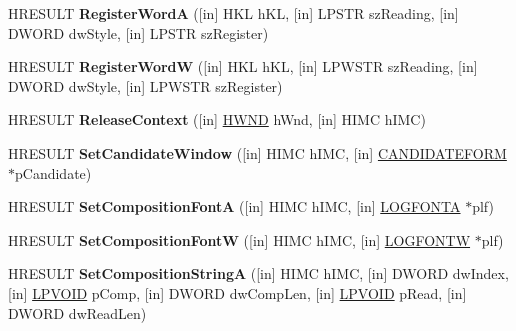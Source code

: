 \begin{DoxyCompactItemize}
H\+R\+E\+S\+U\+LT {\bfseries Register\+WordA} (\mbox{[}in\mbox{]} H\+KL h\+KL, \mbox{[}in\mbox{]} L\+P\+S\+TR sz\+Reading, \mbox{[}in\mbox{]} D\+W\+O\+RD dw\+Style, \mbox{[}in\mbox{]} L\+P\+S\+TR sz\+Register)
\item 
\mbox{\label{interface_i_active_i_m_m_app_aab11a3c8b54a3715093e39444f2d480f}} 
H\+R\+E\+S\+U\+LT {\bfseries Register\+WordW} (\mbox{[}in\mbox{]} H\+KL h\+KL, \mbox{[}in\mbox{]} L\+P\+W\+S\+TR sz\+Reading, \mbox{[}in\mbox{]} D\+W\+O\+RD dw\+Style, \mbox{[}in\mbox{]} L\+P\+W\+S\+TR sz\+Register)
\item 
\mbox{\label{interface_i_active_i_m_m_app_a665730ca4ee2df0d3d7c173e33d30257}} 
H\+R\+E\+S\+U\+LT {\bfseries Release\+Context} (\mbox{[}in\mbox{]} \hyperlink{interfacevoid}{H\+W\+ND} h\+Wnd, \mbox{[}in\mbox{]} H\+I\+MC h\+I\+MC)
\item 
\mbox{\label{interface_i_active_i_m_m_app_a0d21abe7233bb5cc3e3f5140acab9073}} 
H\+R\+E\+S\+U\+LT {\bfseries Set\+Candidate\+Window} (\mbox{[}in\mbox{]} H\+I\+MC h\+I\+MC, \mbox{[}in\mbox{]} \hyperlink{struct_c_a_n_d_i_d_a_t_e_f_o_r_m}{C\+A\+N\+D\+I\+D\+A\+T\+E\+F\+O\+RM} $\ast$p\+Candidate)
\item 
\mbox{\label{interface_i_active_i_m_m_app_ae6ed54a65279d1ae115f1392d75ecdda}} 
H\+R\+E\+S\+U\+LT {\bfseries Set\+Composition\+FontA} (\mbox{[}in\mbox{]} H\+I\+MC h\+I\+MC, \mbox{[}in\mbox{]} \hyperlink{struct_l_o_g_f_o_n_t_a}{L\+O\+G\+F\+O\+N\+TA} $\ast$plf)
\item 
\mbox{\label{interface_i_active_i_m_m_app_a854ea1245b06949f638be09c4a8c4283}} 
H\+R\+E\+S\+U\+LT {\bfseries Set\+Composition\+FontW} (\mbox{[}in\mbox{]} H\+I\+MC h\+I\+MC, \mbox{[}in\mbox{]} \hyperlink{struct_l_o_g_f_o_n_t_w}{L\+O\+G\+F\+O\+N\+TW} $\ast$plf)
\item 
\mbox{\label{interface_i_active_i_m_m_app_ad10f71b33134d43b4da33d1937d444c3}} 
H\+R\+E\+S\+U\+LT {\bfseries Set\+Composition\+StringA} (\mbox{[}in\mbox{]} H\+I\+MC h\+I\+MC, \mbox{[}in\mbox{]} D\+W\+O\+RD dw\+Index, \mbox{[}in\mbox{]} \hyperlink{interfacevoid}{L\+P\+V\+O\+ID} p\+Comp, \mbox{[}in\mbox{]} D\+W\+O\+RD dw\+Comp\+Len, \mbox{[}in\mbox{]} \hyperlink{interfacevoid}{L\+P\+V\+O\+ID} p\+Read, \mbox{[}in\mbox{]} D\+W\+O\+RD dw\+Read\+Len)

\end{DoxyCompactItemize}
